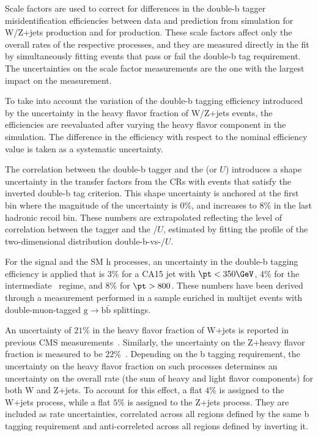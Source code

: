 Scale factors are used to correct for differences in the double-b tagger misidentification efficiencies between data and prediction from simulation for W/Z+jets production and for \ttbar production. These scale factors affect only the overall rates of the respective processes, and they are measured directly in the fit by simultaneously fitting events that pass or fail the double-b tag requirement. The uncertainties on the scale factor measurements are the one with the largest impact on the measurement.

To take into account the variation of the double-b tagging efficiency
introduced by the uncertainty in the heavy flavor fraction of W/Z+jets
events, the efficiencies are reevaluated after varying the heavy
flavor component in the simulation. The difference in the efficiency with respect to the nominal efficiency value is taken as a systematic uncertainty.

%
The correlation between the double-b tagger and the \ptmiss (or $U$) introduces a shape uncertainty in the transfer factors from the CRs with events that satisfy the inverted double-b tag criterion. This shape uncertainty is anchored at the first bin where the magnitude of the uncertainty is 0\%, and increases to 8\% in the last hadronic recoil bin. These numbers are extrapolated reflecting the level of correlation between the tagger and the \ptmiss/$U$, estimated by fitting the profile of the two-dimensional distribution double-b-vs-\ptmiss/$U$.
%

For the signal and the SM h processes, an uncertainty in the double-b tagging efficiency is applied that is 3\% for a CA15 jet with $\pt<350\GeV$, 4\% for the intermediate \pt~regime, and 8\% for $\pt>800$\GeV. These numbers have been derived through a measurement performed in a sample enriched in multijet events with double-muon-tagged $\text{g}\to\text{b}\bar{\text{b}}$ splittings. 

An uncertainty of $21\%$ in the heavy flavor fraction of
W+jets is reported in previous CMS measurements~\cite{Khachatryan:2014uva,Chatrchyan:2013uza}. Similarly, the uncertainty on the Z+heavy flavor fraction is measured to be $22\%$~\cite{Khachatryan:2014zya,Chatrchyan:2014dha}. Depending on the b tagging requirement, the uncertainty on the heavy flavor fraction on such processes determines an uncertainty on the overall rate (the sum of heavy and light flavor components) for both W and Z+jets. To account for this effect, a flat $4\%$ is assigned to the W+jets process, while a flat $5\%$ is assigned to the Z+jets process. They are included as rate uncertainties, correlated across all regions defined by the same b tagging requirement and anti-correleted across all regions defined by inverting it.

